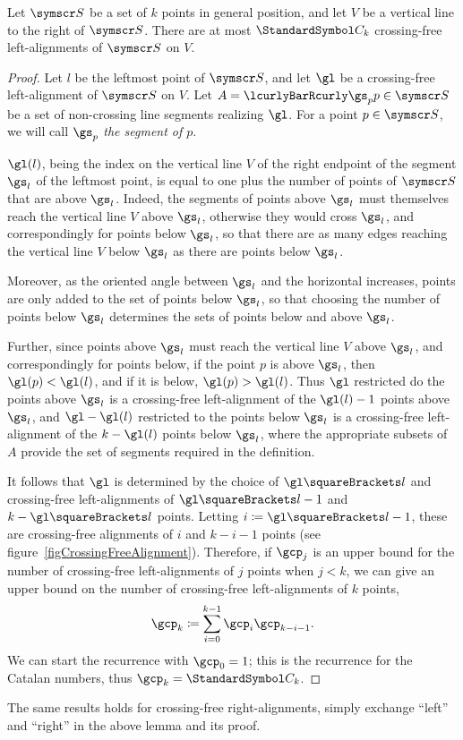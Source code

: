 \documentclass[10pt, a4paper, twoside]{basestyle}
\newcommand{\CatalanNumber}[1]{\StandardSymbol C_{#1}}
\newcommand{\pointset}{\symscr}
\begin{document}
\begin{lemma}
Let ${\pointset S}$ be a set of $k$ points in general position, and let $V$ be a vertical line to the right of ${\pointset S}$.
There are at most $\CatalanNumber k$ crossing-free left-alignments of ${\pointset S}$ on $V$.
\begin{proof}
Let $l$ be the leftmost point of ${\pointset S}$, and let $\gl$ be a crossing-free left-alignment of ${\pointset S}$ on $V$.
Let $A=\setst{\gs_p}{p\in{\pointset S}}$ be a set of non-crossing line segments realizing $\gl$.
For a point $p\in{\pointset S}$, we will call $\gs_p$ \emph{the segment of $p$}.

$\gl(l)$, being the index on the vertical line $V$ of the right endpoint of the segment $\gs_l$ of the leftmost point,
is equal to one plus the number of points of ${\pointset S}$ that are above $\gs_l$. Indeed, the segments of points above
$\gs_l$ must
themselves reach the vertical line $V$ above $\gs_l$, otherwise they would cross $\gs_l$, and correspondingly for
points below $\gs_l$, so that there are as many edges reaching the vertical line $V$ below $\gs_l$ as there are points
below $\gs_l$.

Moreover, as the oriented angle between $\gs_l$ and the horizontal increases, points are only added to the
set of points below $\gs_l$, so that choosing the number of points below $\gs_l$ determines the sets of points
below and above $\gs_l$.

Further, since points above $\gs_l$ must reach the vertical line $V$ above $\gs_l$, and correspondingly for points below,
if the point $p$ is above $\gs_l$, then $\gl(p) < \gl(l)$, and if it is below, $\gl(p) > \gl(l)$. Thus
$\gl$ restricted do the points above $\gs_l$ is a crossing-free left-alignment of the $\gl(l) - 1$ points above
$\gs_l$, and $\gl-\gl(l)$ restricted to the points below $\gs_l$ is a crossing-free left-alignment of the
$k - \gl(l)$ points below $\gs_l$, where the appropriate subsets of $A$ provide the set of segments required
in the definition.

It follows that $\gl$ is determined by the choice of $\gl\of l$ and crossing-free left-align\-ments
of $\gl\of{l}-1$ and $k-\gl\of{l}$ points.
Letting $i\DefineAs \gl\of l - 1$, these are crossing-free alignments of $i$ and $k-i-1$ points (see
figure~\ref{figCrossingFreeAlignment}).
Therefore, if $\gcp_j$ is an upper bound for the number of crossing-free
left-alignments of $j$ points when $j < k$,
we can give an upper bound on the number of crossing-free left-alignments of $k$ points,
\[\gcp_k\DefineAs\sum{i=0}[k-1]\gcp_{i}\gcp_{k-i-1}\text.\]
We can start the recurrence with $\gcp_0 = 1$; this is the recurrence for the Catalan numbers, thus
$\gcp_k=\CatalanNumber k$.
\end{proof}
\end{lemma}
The same results holds for crossing-free right-alignments, simply exchange ``left'' and ``right'' in the above
lemma and its proof.
\end{document}
